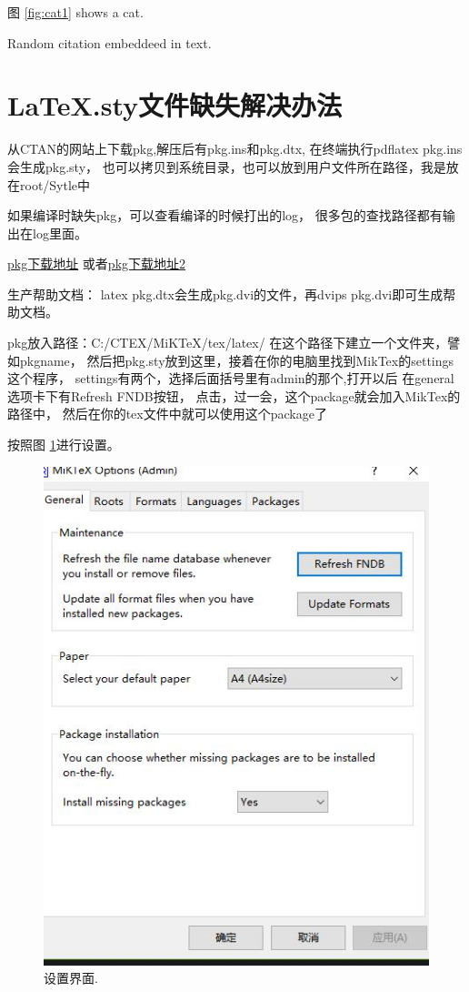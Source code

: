 \documentclass{article}
\begin{document}
  
  图 \ref{fig:cat1} shows a cat.

  Random citation \cite{melissa:1} embeddeed in text.


  \section{LaTeX.sty文件缺失解决办法}
  从CTAN的网站上下载pkg,解压后有pkg.ins和pkg.dtx,
  在终端执行pdflatex pkg.ins会生成pkg.sty，
  也可以拷贝到系统目录，也可以放到用户文件所在路径，我是放在root/Sytle中

  如果编译时缺失pkg，可以查看编译的时候打出的log，
  很多包的查找路径都有输出在log里面。

  
  \href{https://www.ctan.org/pkg}{pkg下载地址}
  或者\href{http://mirrors.cqu.edu.cn/CTAN/macros/latex/contrib/}{pkg下载地址2}

  生产帮助文档：
  latex pkg.dtx会生成pkg.dvi的文件，再dvips pkg.dvi即可生成帮助文档。

  pkg放入路径：C:/CTEX/MiKTeX/tex/latex/
  在这个路径下建立一个文件夹，譬如pkgname，
  然后把pkg.sty放到这里，接着在你的电脑里找到MikTex的settings这个程序，
  settings有两个，选择后面括号里有admin的那个,打开以后
  在general选项卡下有Refresh FNDB按钮，
  点击，过一会，这个package就会加入MikTex的路径中，
  然后在你的tex文件中就可以使用这个package了

  按照图 \ref{fig:set2}进行设置。
  \begin{figure}
    \includegraphics[width=\linewidth]{image/miktex-setting.jpg}
    \caption{设置界面.}
    \label{fig:set2}
  \end{figure}



   
  




  \begin{appendix}
    \listoffigures
    \listoftables
  \end{appendix}
\end{document}
